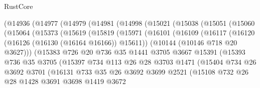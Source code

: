 \begin{lexlean}{RustCore}
\begin{coremodule}
    (@14936
      (@14977
        (@14979
          (@14981
            (@14998
              (@15021
                (@15038
                  (@15051
                    (@15060
                      (@15064
                        (@15373
                          (@15619
                            (@15819
                              (@15971
                                (@16101
                                  (@16109
                                    (@16117
                                      (@16120 (@16126 (@16130 (@16164 @16166)) @15611))
                                      (@10144 (@10146 @718 @20 @3627)))
                                    (@15383
                                      @726
                                      @20
                                      @736
                                      @35
                                      @1441
                                      @3705
                                      @3667
                                      @15391
                                      (@15393
                                        @736
                                        @35
                                        @3705
                                        (@15397
                                          @734
                                          @113
                                          @26
                                          @28
                                          @3703
                                          @1471
                                          (@15404
                                            @734
                                            @26
                                            @3692
                                            @3701
                                            (@16131
                                              @733
                                              @35
                                              @26
                                              @3692
                                              @3699
                                              @2521
                                              (@15108
                                                @732
                                                @26
                                                @28
                                                @1428
                                                @3691
                                                @3698
                                                @1419
                                                @3672

\end{coremodule}
\end{lexlean}
